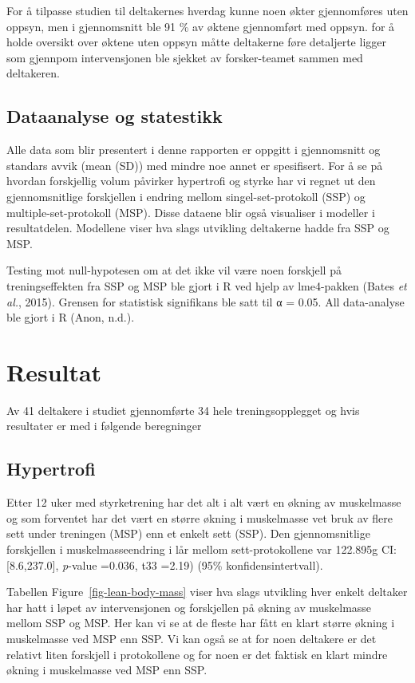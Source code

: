 \documentclass[
  letterpaper,
  DIV=11,
  numbers=noendperiod]{scrreprt}
\begin{document}
For å tilpasse studien til deltakernes hverdag kunne noen økter
gjennomføres uten oppsyn, men i gjennomsnitt ble 91 \% av øktene
gjennomført med oppsyn. for å holde oversikt over øktene uten oppsyn
måtte deltakerne føre detaljerte ligger som gjennpom intervensjonen ble
sjekket av forsker-teamet sammen med deltakeren.

\subsection{Dataanalyse og statestikk}\label{dataanalyse-og-statestikk}

Alle data som blir presentert i denne rapporten er oppgitt i
gjennomsnitt og standars avvik (mean (SD)) med mindre noe annet er
spesifisert. For å se på hvordan forskjellig volum påvirker hypertrofi
og styrke har vi regnet ut den gjennomsnitlige forskjellen i endring
mellom singel-set-protokoll (SSP) og multiple-set-protokoll (MSP). Disse
dataene blir også visualiser i modeller i resultatdelen. Modellene viser
hva slags utvikling deltakerne hadde fra SSP og MSP.

Testing mot null-hypotesen om at det ikke vil være noen forskjell på
treningseffekten fra SSP og MSP ble gjort i R ved hjelp av lme4-pakken
(Bates \emph{et al.}, 2015). Grensen for statistisk signifikans ble satt
til α = 0.05. All data-analyse ble gjort i R (Anon, n.d.).

\section{Resultat}\label{resultat-1}

Av 41 deltakere i studiet gjennomførte 34 hele treningsopplegget og hvis
resultater er med i følgende beregninger

\subsection{Hypertrofi}\label{hypertrofi}

Etter 12 uker med styrketrening har det alt i alt vært en økning av
muskelmasse og som forventet har det vært en større økning i muskelmasse
vet bruk av flere sett under treningen (MSP) enn et enkelt sett (SSP).
Den gjennomsnitlige forskjellen i muskelmasseendring i lår mellom
sett-protokollene var 122.895g CI: {[}8.6,237.0{]}, \emph{p}-value
=0.036, t33 =2.19) (95\% konfidensintertvall).

Tabellen Figure~\ref{fig-lean-body-mass} viser hva slags utvikling hver
enkelt deltaker har hatt i løpet av intervensjonen og forskjellen på
økning av muskelmasse mellom SSP og MSP. Her kan vi se at de fleste har
fått en klart større økning i muskelmasse ved MSP enn SSP. Vi kan også
se at for noen deltakere er det relativt liten forskjell i protokollene
og for noen er det faktisk en klart mindre økning i muskelmasse ved MSP
enn SSP.
\end{document}
